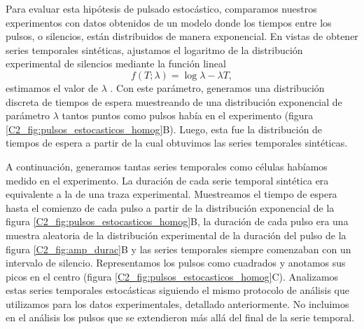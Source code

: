 \documentclass[./main.tex]{subfiles}
\begin{document}
Para evaluar esta hipótesis de pulsado estocástico, comparamos nuestros experimentos con datos obtenidos de un modelo donde los tiempos entre los pulsos, o silencios, están distribuidos de manera exponencial. En vistas de obtener series temporales sintéticas, ajustamos el logaritmo de la distribución experimental de silencios mediante la función lineal 
\begin{equation}
    f(T;\lambda) = \log{\lambda} - \lambda T,
    \label{C2_eq:ajuste_homogeneo}
\end{equation}
estimamos el valor de $\lambda$ \cite{Harris2020}. Con este parámetro, generamos una distribución discreta de tiempos de espera muestreando de una distribución exponencial de parámetro $\lambda$ tantos puntos como pulsos había en el experimento (figura \ref{C2_fig:pulsos_estocasticos_homog}B). Luego, esta fue la distribución de tiempos de espera a partir de la cual obtuvimos las series temporales sintéticas.  

A continuación, generamos tantas series temporales como células habíamos medido en el experimento. La duración de cada serie temporal sintética era equivalente a la de una traza experimental. Muestreamos el tiempo de espera hasta el comienzo de cada pulso a partir de la distribución exponencial de la figura \ref{C2_fig:pulsos_estocasticos_homog}B, la duración de cada pulso era una muestra aleatoria de la distribución experimental de la duración del pulso de la figura \ref{C2_fig:amp_durac}B y las series temporales siempre comenzaban con un intervalo de silencio. Representamos los pulsos como cuadrados y anotamos sus picos en el centro (figura \ref{C2_fig:pulsos_estocasticos_homog}C). Analizamos estas series temporales estocásticas siguiendo el mismo protocolo de análisis que utilizamos para los datos experimentales, detallado anteriormente. No incluimos en el análisis los pulsos que se extendieron más allá del final de la serie temporal. 
\end{document}
